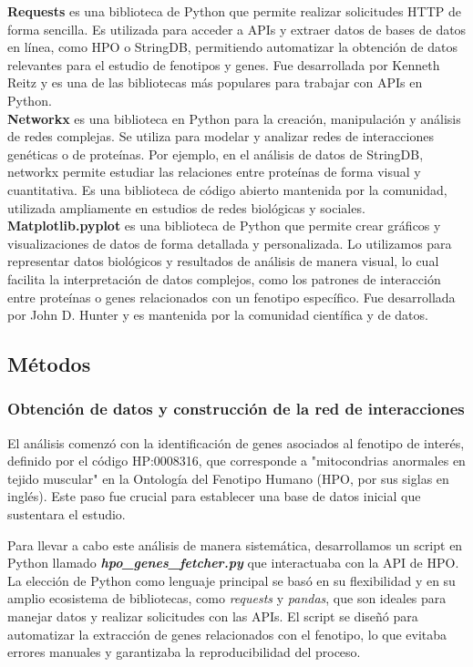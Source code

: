 \textbf{Requests} es una biblioteca de Python que permite realizar solicitudes HTTP de forma sencilla.
Es utilizada para acceder a APIs y extraer datos de bases de datos en línea, como HPO o StringDB, permitiendo automatizar la obtención de datos relevantes para el estudio de fenotipos y genes.
Fue desarrollada por Kenneth Reitz y es una de las bibliotecas más populares para trabajar con APIs en Python.\cite{chandra2015python}\\


\textbf{Networkx} es una biblioteca en Python para la creación, manipulación y análisis de redes complejas.
Se utiliza para modelar y analizar redes de interacciones genéticas o de proteínas. Por ejemplo, en el análisis de datos de StringDB, networkx permite estudiar las relaciones entre proteínas de forma visual y cuantitativa.
Es una biblioteca de código abierto mantenida por la comunidad, utilizada ampliamente en estudios de redes biológicas y sociales.\cite{hagberg2020networkx}\\


\textbf{Matplotlib.pyplot} es una biblioteca de Python que permite crear gráficos y visualizaciones de datos de forma detallada y personalizada.
Lo utilizamos para representar datos biológicos y resultados de análisis de manera visual, lo cual facilita la interpretación de datos complejos, como los patrones de interacción entre proteínas o genes relacionados con un fenotipo específico.
Fue desarrollada por John D. Hunter y es mantenida por la comunidad científica y de datos.\cite{ari2014matplotlib}



\subsection{\textbf{Métodos}}

\subsubsection{\textbf{Obtención de datos y construcción de la red de interacciones}}

El análisis comenzó con la identificación de genes asociados al fenotipo de interés, definido por el código HP:0008316, que corresponde a "mitocondrias anormales en tejido muscular" en la Ontología del Fenotipo Humano (HPO, por sus siglas en inglés). Este paso fue crucial para establecer una base de datos inicial que sustentara el estudio.

Para llevar a cabo este análisis de manera sistemática, desarrollamos un script en Python llamado \textbf{\textit{hpo\_genes\_fetcher.py}} que interactuaba con la API de HPO. La elección de Python como lenguaje principal se basó en su flexibilidad y en su amplio ecosistema de bibliotecas, como \textit{requests} y \textit{pandas}, que son ideales para manejar datos y realizar solicitudes con las APIs. El script se diseñó para automatizar la extracción de genes relacionados con el fenotipo, lo que evitaba errores manuales y garantizaba la reproducibilidad del proceso.

